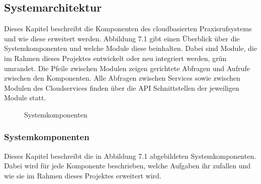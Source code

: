 \subsection{Systemarchitektur}

Dieses Kapitel beschreibt die Komponenten des cloudbasierten Praxisrufsystems und wie diese erweitert werden.
Abbildung 7.1 gibt einen Überblick über die Systemkomponenten und welche Module diese beinhalten.
Dabei sind Module, die im Rahmen dieses Projektes entwickelt oder neu integriert werden, grün umrandet.
Die Pfeile zwischen Modulen zeigen gerichtete Abfragen und Aufrufe zwischen den Komponenten.
Alle Abfragen zwischen Services sowie zwischen Modulen des Cloudservices finden über die API Schnittstellen der jeweiligen Module statt.

\begin{figure}[h]
    \centering
    \begin{minipage}[b]{0.8\textwidth}
        \caption{Systemkomponenten}
    \end{minipage}
\end{figure}

\subsubsection{Systemkomponenten}

Dieses Kapitel beschreibt die in Abbildung 7.1 abgebildeten Systemkomponenten.
Dabei wird für jede Komponente beschrieben, welche Aufgaben ihr zufallen und wie sie im Rahmen dieses Projektes erweitert wird.

